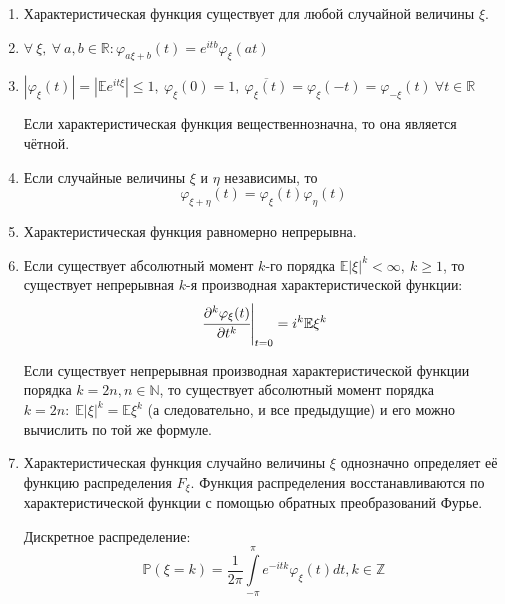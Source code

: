 \begin{namedthm}\leavevmode
    \begin{enumerate}
        \item Характеристическая функция существует для любой случайной величины $\xi$.
        \item $\forall~ \xi,~ \forall~ a, b \in \mathbb{R} \colon \varphi_{a \xi + b}(t) = e^{itb} \varphi_{\xi}(at)$
        \item $|\varphi_{\xi}(t)|=|\mathbb{E} e^{i t \xi}| \leqslant 1,~ \varphi_{\xi}(0) = 1, ~\overline{\varphi_{\xi}(t)} = \varphi_{\xi}(-t) = \varphi_{-\xi}(t) ~\forall t \in \mathbb{R}$
        
        \mycon{}
        Если характеристическая функция вещественнозначна, то она является чётной.
        
        \item Если случайные величины $\xi$ и $\eta$ независимы, то
        \begin{equation*}
            \varphi_{\xi + \eta}(t) = \varphi_{\xi}(t) \varphi_{\eta}(t)
        \end{equation*}
        \item Характеристическая функция равномерно непрерывна.
        \item Если существует абсолютный момент $k$-го порядка $\mathbb{E}|\xi|^{k} < \infty,~ k \geqslant 1$, то существует непрерывная $k$-я производная характеристической функции:
        \begin{equation*}
            \left.\cfrac{\partial^{k} \varphi_{\xi}(t)}{\partial t^{k}}\right|_{t=0}= i^{k} \mathbb{E} \xi^{k}
        \end{equation*}
        
        Если существует непрерывная производная характеристической функции порядка $k = 2n, n \in \mathbb{N}$, то существует абсолютный момент порядка $k = 2n: \; \mathbb{E}|\xi|^k = \mathbb{E}\xi^k$ (а следовательно, и все предыдущие) и его можно вычислить по той же формуле.
        
        \item Характеристическая функция случайно величины $\xi$ однозначно определяет её функцию распределения $F_{\xi}$. Функция распределения восстанавливаются по характеристической функции с помощью обратных преобразований Фурье.
        
        Дискретное распределение:
        \begin{equation*}
            \mathbb{P}(\xi=k)=\frac{1}{2 \pi} \int\limits_{-\pi}^{\pi} e^{-i t k} \varphi_{\xi}(t) d t, k \in \mathbb{Z}
        \end{equation*}
        

\end{enumerate}
\end{namedthm}
